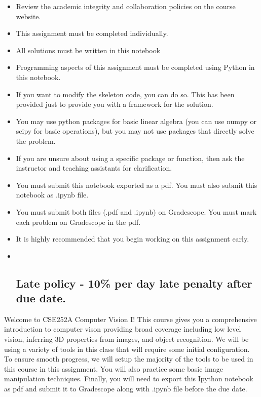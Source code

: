 \documentclass[11pt]{article}
\begin{document}
\begin{itemize}
\item
  Review the academic integrity and collaboration policies on the course
  website.
\item
  This assignment must be completed individually.
\item
  All solutions must be written in this notebook
\item
  Programming aspects of this assignment must be completed using Python
  in this notebook.
\item
  If you want to modify the skeleton code, you can do so. This has been
  provided just to provide you with a framework for the solution.
\item
  You may use python packages for basic linear algebra (you can use
  numpy or scipy for basic operations), but you may not use packages
  that directly solve the problem.
\item
  If you are unsure about using a specific package or function, then ask
  the instructor and teaching assistants for clarification.
\item
  You must submit this notebook exported as a pdf. You must also submit
  this notebook as .ipynb file.
\item
  You must submit both files (.pdf and .ipynb) on Gradescope. You must
  mark each problem on Gradescope in the pdf.
\item
  It is highly recommended that you begin working on this assignment
  early.
\item ~
  \subsection{\texorpdfstring{\textbf{Late policy} - 10\% per day late
  penalty after due
  date.}{Late policy - 10\% per day late penalty after due date.}}\label{late-policy---10-per-day-late-penalty-after-due-date.}
\end{itemize}

Welcome to CSE252A Computer Vision I! This course gives you a
comprehensive introduction to computer vison providing broad coverage
including low level vision, inferring 3D properties from images, and
object recognition. We will be using a variety of tools in this class
that will require some initial configuration. To ensure smooth progress,
we will setup the majority of the tools to be used in this course in
this assignment. You will also practice some basic image manipulation
techniques. Finally, you will need to export this Ipython notebook as
pdf and submit it to Gradescope along with .ipynb file before the due
date.
\end{document}
